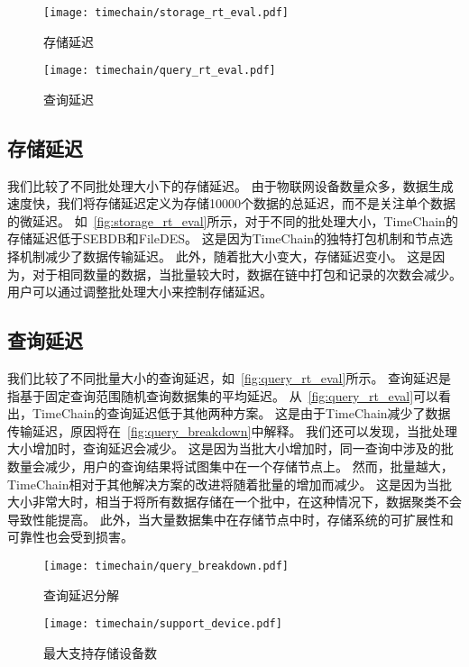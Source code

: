 \begin{figure*}[t]
    \centering
	\begin{minipage}{0.48\linewidth}
        \centering
        \texttt{[image: timechain/storage\_rt\_eval.pdf]}
        \caption{存储延迟}
        \label{fig:storage_rt_eval}
    \end{minipage}
    \quad
    \begin{minipage}{0.48\linewidth}
        \centering
        \texttt{[image: timechain/query\_rt\_eval.pdf]}
        \caption{查询延迟}
        \label{fig:query_rt_eval}
	\end{minipage}
\end{figure*}

\subsection{存储延迟}
我们比较了不同批处理大小下的存储延迟。
由于物联网设备数量众多，数据生成速度快，我们将存储延迟定义为存储10000个数据的总延迟，而不是关注单个数据的微延迟。
如~\autoref{fig:storage_rt_eval}所示，对于不同的批处理大小，TimeChain的存储延迟低于SEBDB和FileDES。
这是因为TimeChain的独特打包机制和节点选择机制减少了数据传输延迟。
此外，随着批大小变大，存储延迟变小。
这是因为，对于相同数量的数据，当批量较大时，数据在链中打包和记录的次数会减少。
用户可以通过调整批处理大小来控制存储延迟。

\subsection{查询延迟}
我们比较了不同批量大小的查询延迟，如~\autoref{fig:query_rt_eval}所示。
查询延迟是指基于固定查询范围随机查询数据集的平均延迟。
从~\autoref{fig:query_rt_eval}可以看出，TimeChain的查询延迟低于其他两种方案。
这是由于TimeChain减少了数据传输延迟，原因将在~\autoref{fig:query_breakdown}中解释。
我们还可以发现，当批处理大小增加时，查询延迟会减少。
这是因为当批大小增加时，同一查询中涉及的批数量会减少，用户的查询结果将试图集中在一个存储节点上。
然而，批量越大，TimeChain相对于其他解决方案的改进将随着批量的增加而减少。
这是因为当批大小非常大时，相当于将所有数据存储在一个批中，在这种情况下，数据聚类不会导致性能提高。
此外，当大量数据集中在存储节点中时，存储系统的可扩展性和可靠性也会受到损害。

\begin{figure*}[t]
    \centering
    \begin{minipage}{0.48\linewidth}
        \centering
        \texttt{[image: timechain/query\_breakdown.pdf]}
        \caption{查询延迟分解}
        \label{fig:query_breakdown}
	\end{minipage}
	\quad
	\begin{minipage}{0.48\linewidth}
        \centering
        \texttt{[image: timechain/support\_device.pdf]}
        \caption{最大支持存储设备数}
        \label{fig:support_device}
    \end{minipage}
\end{figure*}

